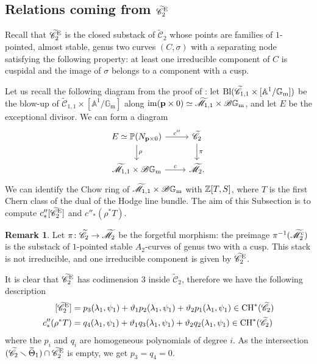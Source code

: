 \documentclass[a4paper, 10pt]{amsart}
\numberwithin{equation}{section}
\numberwithin{subsection}{section}
\theoremstyle{definition}
\newtheorem{remark}[theorem]{Remark}
\theoremstyle{remark}
\renewcommand{\mathcal}{\mathscr}
\renewcommand\AA{\mathbb{A}} \newcommand\BB{\mathbb{B}}
\newcommand\GG{\mathbb{G}} \newcommand\HH{\mathbb{H}}
\newcommand\rmm{\mathrm{m}} \newcommand\rmn{\mathrm{n}}
\newcommand\arr{\ifinner\to\else\longrightarrow\fi}
\newcommand\im[1]{\operatorname{im}(#1)}
\renewcommand{\setminus}{\smallsetminus}
\newcommand{\gm}{\GG_{\rmm}}
\newcommand{\Mtilde}{\widetilde{\mathcal M}}
\newcommand{\Ctilde}{\widetilde{\mathcal C}}
\newcommand{\ThTilde}{\widetilde{\Theta}}
\newcommand{\ch}[1][*]{\operatorname{CH}^{#1}}
\begin{document}
	\subsection{Relations coming from $\Ctilde_2^{\rm E}$}
	Recall that $\Ctilde_2^{\rm E}$ is the closed substack of $\Ctilde_2$ whose points are families of $1$-pointed, almost stable, genus two curves $(C,\sigma)$ with a separating node satisfying the following property: at least one irreducible component of $C$ is cuspidal and the image of $\sigma$ belongs to a component with a cusp.
	
	Let us recall the following diagram from the proof of : let $\rm{Bl}(\Ctilde_{1,1}\times [\AA^1/\gm])$ be the blow-up of $\Ctilde_{1,1}\times [\AA^1/\gm]$ along $\im{\bfp\times 0}\simeq \Mtilde_{1,1}\times\cB\gm$, and let $E$ be the exceptional divisor. We can form a diagram
	\[
	\begin{tikzcd}
	    E\simeq\PP(N_{\bfp\times 0}) \ar[r, "c''"] \ar[d, "\rho"] & \Ctilde_2 \ar[d, "\pi"] \\
	    \Mtilde_{1,1}\times\cB\gm \ar[r, "c"] & \Mtilde_2.
	\end{tikzcd}
	\]
	We can identify the Chow ring of $\Mtilde_{1,1}\times\cB\gm$ with $\mathbb{Z}[T,S]$, where $T$ is the first Chern class of the dual of the Hodge line bundle.
	The aim of this Subsection is to compute $c''_*[\Ctilde_2^{\rm E}]$ and $c''_*(\rho^*T)$.
	
	\begin{remark}
		Let $\pi\colon\Ctilde_2\arr\Mtilde_2$ be the forgetful morphism: the preimage $\pi^{-1}(\Mtilde_2^{\rm c})$ is the substack of $1$-pointed stable $A_2$-curves of genus two with a cusp. This stack is not irreducible, and one irreducible component is given by $\Ctilde_2^{\rm E}$.
	\end{remark}
	It is clear that $\Ctilde_2^{\rm E}$ has codimension 3 inside $\Ctilde_2$, therefore we have the following description 
	\begin{align}\label{eq:class of C2tildeE} [\Ctilde_2^{\rm E}] &= p_3(\lambda_1,\psi_1) + \vartheta_1p_2(\lambda_1,\psi_1) + \vartheta_2 p_1(\lambda_1,\psi_1) \in \ch (\Ctilde_2)\\
	c''_*(\rho^*T)&= q_4(\lambda_1,\psi_1) + \vartheta_1q_3(\lambda_1,\psi_1) + \vartheta_2 q_2(\lambda_1,\psi_1) \in \ch (\Ctilde_2) \nonumber\end{align} 
	where the $p_i$ and $q_i$ are homogeneous polynomials of degree $i$.
	As the intersection $(\Ctilde_2\setminus \ThTilde_1) \cap \Ctilde_2^{\rm E} $ is empty, we get $p_3=q_4=0$.
	
\end{document}

